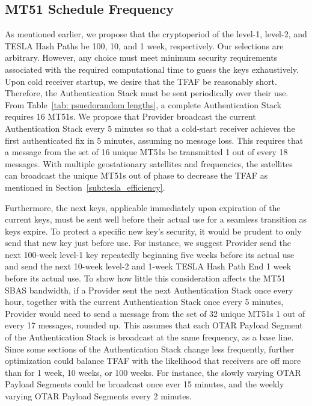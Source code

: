 \documentclass[APA,STIX1COL]{IONjournal/ION-APA Template}
\begin{document}
	\subsection{MT51 Schedule Frequency} \label{sub:mt51_schedule_frequency}

		As mentioned earlier, we propose that the cryptoperiod of the level-1, level-2, and TESLA Hash Paths be 100, 10, and 1 week, respectively.
		Our selections are arbitrary.
		However,  any choice must meet minimum security requirements associated with the required computational time to guess the keys exhaustively.
		Upon cold receiver startup, we desire that the TFAF be reasonably short.
		Therefore, the Authentication Stack must be sent periodically over their use.
		From Table~\ref{tab: psuedorandom lengths}, a complete Authentication Stack requires 16 MT51s. 
		We propose that Provider broadcast the current Authentication Stack every 5 minutes so that a cold-start receiver achieves the first authenticated fix in 5 minutes, assuming no message loss.
		This requires that a message from the set of 16 unique MT51s be transmitted 1 out of every 18 messages.
		With multiple geostationary satellites and frequencies, the satellites can broadcast the unique MT51s out of phase to decrease the TFAF as mentioned in Section~\ref{sub:tesla_efficiency}.

		Furthermore, the next keys, applicable immediately upon expiration of the current keys, must be sent well before their actual use for a seamless transition as keys expire.
		To protect a specific new key's security, it would be prudent to only send that new key just before use.
		For instance, we suggest Provider send the next 100-week level-1 key repeatedly beginning five weeks before its actual use and send the next 10-week level-2 and 1-week TESLA Hash Path End 1 week before its actual use.
		To show how little this consideration affects the MT51 SBAS bandwidth, if a Provider sent the next Authentication Stack once every hour, together with the current Authentication Stack once every 5 minutes, Provider would need to send a message from the set of 32 unique MT51s 1 out of every 17 messages, rounded up.
		This assumes that each OTAR Payload Segment of the Authentication Stack is broadcast at the same frequency, as a base line.
		Since some sections of the Authentication Stack change less frequently, further optimization could balance TFAF with the likelihood that receivers are off more than for 1 week, 10 weeks, or 100 weeks.
		For instance, the slowly varying OTAR Payload Segments could be broadcast once ever 15 minutes, and the weekly varying OTAR Payload Segments every 2 minutes.
\end{document}
